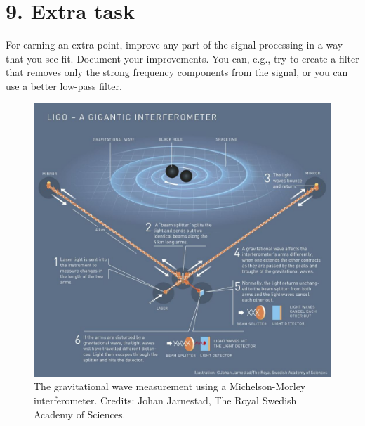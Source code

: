 \section{9. Extra task}
For earning an extra point, improve any part of the signal processing
in a way that you see fit. Document your improvements. You can, e.g.,
try to create a filter that removes only the strong frequency
components from the signal, or you can use a better low-pass filter.

\begin{figure}
\begin{center}
\includegraphics[width=\textwidth]{Assignments/figures/ligo_nobel.jpg}
\end{center}
\caption{The gravitational wave measurement using a Michelson-Morley interferometer. Credits: Johan Jarnestad, The Royal Swedish Academy of Sciences.}
\label{fig:ligo_nobel_diag}
\end{figure}

